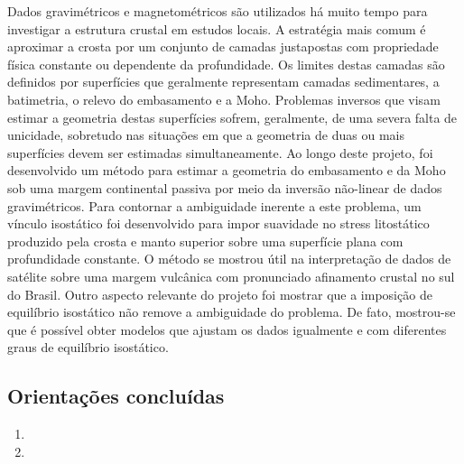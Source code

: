 Dados gravimétricos e magnetométricos são utilizados há muito tempo para investigar 
a estrutura crustal em estudos locais. A estratégia mais comum é aproximar a crosta por 
um conjunto de camadas justapostas com propriedade física constante ou dependente 
da profundidade. Os limites destas camadas são definidos por superfícies que geralmente 
representam camadas sedimentares, a batimetria, o relevo do embasamento e a Moho. 
Problemas inversos que visam estimar a geometria destas superfícies sofrem, geralmente, 
de uma severa falta de unicidade, sobretudo nas situações em que a geometria de duas 
ou mais superfícies devem ser estimadas simultaneamente. Ao longo deste projeto, 
foi desenvolvido um método para estimar a geometria do embasamento e da Moho sob  
uma margem continental passiva por meio da inversão não-linear de dados 
gravimétricos. Para contornar a ambiguidade inerente a este problema, um vínculo 
isostático foi desenvolvido para impor suavidade no stress litostático produzido pela 
crosta e manto superior sobre uma superfície plana com profundidade constante. 
O método se mostrou útil na interpretação de dados de satélite 
sobre uma margem vulcânica com pronunciado afinamento crustal no sul do Brasil. 
Outro aspecto relevante do projeto foi mostrar que a imposição de equilíbrio isostático 
não remove a ambiguidade do problema. De fato, mostrou-se que é possível obter modelos 
que ajustam os dados igualmente e com diferentes graus de equilíbrio isostático.


\subsection*{Orientações concluídas}

\begin{enumerate}
	
	\item{}
	
	\item{}
	
\end{enumerate}

